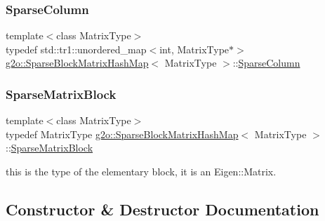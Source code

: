\subsubsection{\texorpdfstring{Sparse\+Column}{SparseColumn}}
{\footnotesize\ttfamily template$<$class Matrix\+Type$>$ \\
typedef std\+::tr1\+::unordered\+\_\+map$<$int, Matrix\+Type$\ast$$>$ \mbox{\hyperlink{classg2o_1_1_sparse_block_matrix_hash_map}{g2o\+::\+Sparse\+Block\+Matrix\+Hash\+Map}}$<$ Matrix\+Type $>$\+::\mbox{\hyperlink{classg2o_1_1_sparse_block_matrix_hash_map_ae364a722296b90e32dd6c3a8fbeb49ae}{Sparse\+Column}}}

\mbox{\label{classg2o_1_1_sparse_block_matrix_hash_map_a03d422844dbf0b10f4fcf7e69fdb0bca}} 
\subsubsection{\texorpdfstring{Sparse\+Matrix\+Block}{SparseMatrixBlock}}
{\footnotesize\ttfamily template$<$class Matrix\+Type$>$ \\
typedef Matrix\+Type \mbox{\hyperlink{classg2o_1_1_sparse_block_matrix_hash_map}{g2o\+::\+Sparse\+Block\+Matrix\+Hash\+Map}}$<$ Matrix\+Type $>$\+::\mbox{\hyperlink{classg2o_1_1_sparse_block_matrix_hash_map_a03d422844dbf0b10f4fcf7e69fdb0bca}{Sparse\+Matrix\+Block}}}



this is the type of the elementary block, it is an Eigen\+::\+Matrix. 



\subsection{Constructor \& Destructor Documentation}
\mbox{\label{classg2o_1_1_sparse_block_matrix_hash_map_abe4b64edb59d95b632d7f655445157df}} 
